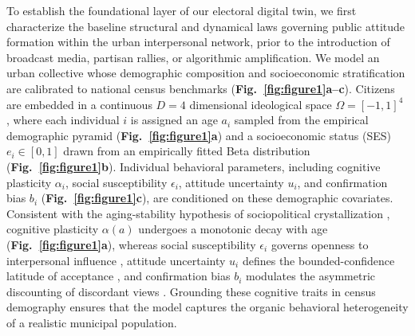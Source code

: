 \documentclass{article}
\begin{document}
To establish the foundational layer of our electoral digital twin, we first characterize the baseline structural and dynamical laws governing public attitude formation within the urban interpersonal network, prior to the introduction of broadcast media, partisan rallies, or algorithmic amplification. We model an urban collective whose demographic composition and socioeconomic stratification are calibrated to national census benchmarks \citep{ibge2022censo} (\textbf{Fig.~\ref{fig:figure1}a--c}). Citizens are embedded in a continuous $D=4$ dimensional ideological space $\Omega = [-1, 1]^4$ \citep{converse1964nature}, where each individual $i$ is assigned an age $a_i$ sampled from the empirical demographic pyramid (\textbf{Fig.~\ref{fig:figure1}a}) and a socioeconomic status (SES) $e_i \in [0, 1]$ drawn from an empirically fitted Beta distribution (\textbf{Fig.~\ref{fig:figure1}b}). Individual behavioral parameters, including cognitive plasticity $\alpha_i$, social susceptibility $\epsilon_i$, attitude uncertainty $u_i$, and confirmation bias $b_i$ (\textbf{Fig.~\ref{fig:figure1}c}), are conditioned on these demographic covariates. Consistent with the aging-stability hypothesis of sociopolitical crystallization \citep{alwin1991aging, kiley2020measuring}, cognitive plasticity $\alpha(a)$ undergoes a monotonic decay with age (\textbf{Fig.~\ref{fig:figure1}a}), whereas social susceptibility $\epsilon_i$ governs openness to interpersonal influence \citep{friedkin1990social}, attitude uncertainty $u_i$ defines the bounded-confidence latitude of acceptance \citep{sherif1961social, howe2017attitude}, and confirmation bias $b_i$ modulates the asymmetric discounting of discordant views \citep{lord1979biased, dandekar2013biased}. Grounding these cognitive traits in census demography ensures that the model captures the organic behavioral heterogeneity of a realistic municipal population.
\end{document}
